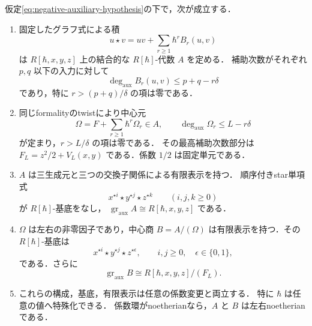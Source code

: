 \begin{theorem}[負の補助次数による代数化]
\label{thm:negative-auxiliary-algebraization}
仮定\eqref{eq:negative-auxiliary-hypothesis}の下で，次が成立する．
\begin{enumerate}
\item 固定したグラフ式による積
\[
 u\star v=uv+\sum_{r\ge1}\hbar^r B_r(u,v)
\]
は $R[\hbar,x,y,z]$ 上の結合的な $R[\hbar]$-代数 $A$ を定める．
補助次数がそれぞれ $p,q$ 以下の入力に対して
\[
 \deg_{\mathrm{aux}}B_r(u,v)\le p+q-r\delta
\]
であり，特に $r>(p+q)/\delta$ の項は零である．
\item 同じformalityのtwistにより中心元
\[
 \Omega=F+\sum_{r\ge1}\hbar^r\Omega_r\in A,
 \qquad
 \deg_{\mathrm{aux}}\Omega_r\le L-r\delta
\]
が定まり，$r>L/\delta$ の項は零である．
その最高補助次数部分は
$F_L=z^2/2+V_L(x,y)$ である．係数 $1/2$ は固定単元である．
\item $A$ は三生成元と三つの交換子関係による有限表示を持つ．
順序付きstar単項式
\[
 x^{\star i}\star y^{\star j}\star z^{\star k}
 \qquad (i,j,k\ge0)
\]
が $R[\hbar]$-基底をなし，
$\operatorname{gr}_{\mathrm{aux}}A\cong R[\hbar,x,y,z]$ である．
\item $\Omega$ は左右の非零因子であり，中心商
$B=A/(\Omega)$ は有限表示を持つ．その $R[\hbar]$-基底は
\[
 x^{\star i}\star y^{\star j}\star z^{\star\epsilon},
 \qquad i,j\ge0,\quad\epsilon\in\{0,1\},
\]
である．さらに
\[
 \operatorname{gr}_{\mathrm{aux}}B
 \cong R[\hbar,x,y,z]/(F_L).
\]
\item これらの構成，基底，有限表示は任意の係数変更と両立する．
特に $\hbar$ は任意の値へ特殊化できる．
係数環がnoetherianなら，$A$ と $B$ は左右noetherianである．
\end{enumerate}
\end{theorem}

